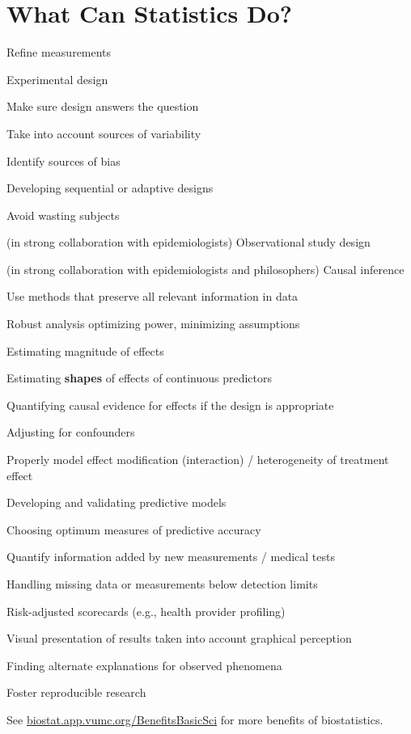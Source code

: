 \section{What Can Statistics Do?}
\bi
\item Refine measurements
\item Experimental design
  \bi
  \item Make sure design answers the question
  \item Take into account sources of variability
  \item Identify sources of bias
  \item Developing sequential or adaptive designs
  \item Avoid wasting subjects
    \ei
\item {\smaller (in strong collaboration with epidemiologists)} Observational
  study design
\item {\smaller (in strong collaboration with epidemiologists and
  philosophers)} Causal inference
\item Use methods that preserve all relevant information in data
\item Robust analysis optimizing power, minimizing assumptions
\item Estimating magnitude of effects
\item Estimating \textbf{shapes} of effects of continuous predictors
\item Quantifying causal evidence for effects if the design is appropriate
\item Adjusting for confounders
\item Properly model effect modification (interaction) / heterogeneity
  of treatment effect
\item Developing and validating predictive models
\item Choosing optimum measures of predictive accuracy
\item Quantify information added by new measurements / medical tests
\item Handling missing data or measurements below detection limits
\item Risk-adjusted scorecards (e.g., health provider profiling)
\item Visual presentation of results taken into account graphical
  perception
\item Finding alternate explanations for observed phenomena
\item Foster reproducible research
\ei   

See
\href{http://biostat.app.vumc.org/BenefitsBasicSci}{biostat.app.vumc.org/BenefitsBasicSci}
for more benefits of biostatistics.

